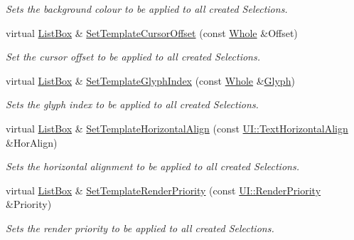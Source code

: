 \begin{DoxyCompactItemize}
\begin{DoxyCompactList}\small\item\em Sets the background colour to be applied to all created Selections. \item\end{DoxyCompactList}\item 
virtual \hyperlink{classMezzanine_1_1UI_1_1ListBox}{ListBox} \& \hyperlink{classMezzanine_1_1UI_1_1ListBox_a2ce73aa7cca0365ef052de34b387fb8f}{SetTemplateCursorOffset} (const \hyperlink{namespaceMezzanine_adcbb6ce6d1eb4379d109e51171e2e493}{Whole} \&Offset)
\begin{DoxyCompactList}\small\item\em Set the cursor offset to be applied to all created Selections. \item\end{DoxyCompactList}\item 
virtual \hyperlink{classMezzanine_1_1UI_1_1ListBox}{ListBox} \& \hyperlink{classMezzanine_1_1UI_1_1ListBox_a7aaf12f4ac3d15f059761646fc111b48}{SetTemplateGlyphIndex} (const \hyperlink{namespaceMezzanine_adcbb6ce6d1eb4379d109e51171e2e493}{Whole} \&\hyperlink{classMezzanine_1_1UI_1_1Glyph}{Glyph})
\begin{DoxyCompactList}\small\item\em Sets the glyph index to be applied to all created Selections. \item\end{DoxyCompactList}\item 
virtual \hyperlink{classMezzanine_1_1UI_1_1ListBox}{ListBox} \& \hyperlink{classMezzanine_1_1UI_1_1ListBox_afcbed87ee667512e55b6bb4249582189}{SetTemplateHorizontalAlign} (const \hyperlink{namespaceMezzanine_1_1UI_aebbd46e62bb20d958f1915c1ec6cc549}{UI::TextHorizontalAlign} \&HorAlign)
\begin{DoxyCompactList}\small\item\em Sets the horizontal alignment to be applied to all created Selections. \item\end{DoxyCompactList}\item 
virtual \hyperlink{classMezzanine_1_1UI_1_1ListBox}{ListBox} \& \hyperlink{classMezzanine_1_1UI_1_1ListBox_ae4b5fd90298eaf10677011ecfaf7487c}{SetTemplateRenderPriority} (const \hyperlink{namespaceMezzanine_1_1UI_ac4c753eb6b5d66350a243acc9ce54130}{UI::RenderPriority} \&Priority)
\begin{DoxyCompactList}\small\item\em Sets the render priority to be applied to all created Selections. \item\end{DoxyCompactList}\item 

\end{DoxyCompactItemize}
